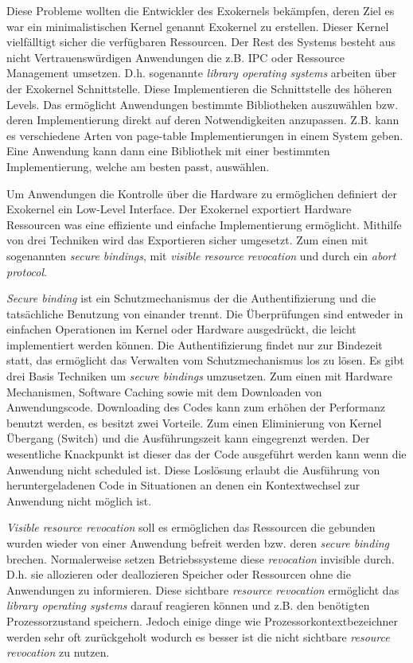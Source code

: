 \documentclass[11pt,technote]{IEEEtran}
\begin{document}
      Diese Probleme wollten die Entwickler des Exokernels bek\"ampfen, deren Ziel es war ein minimalistischen Kernel genannt Exokernel zu erstellen.
      Dieser Kernel vielf\"alltigt sicher die verf\"ugbaren Ressourcen. Der Rest des Systems besteht aus nicht Vertrauensw\"urdigen Anwendungen die
      z.B. IPC oder Ressource Management umsetzen. D.h. sogenannte \textit{library operating systems} arbeiten \"uber der Exokernel Schnittstelle. 
      Diese Implementieren die Schnittstelle des h\"oheren Levels. Das erm\"oglicht Anwendungen bestimmte Bibliotheken auszuw\"ahlen bzw.
      deren Implementierung direkt auf deren Notwendigkeiten anzupassen. Z.B. kann es verschiedene Arten von page-table Implementierungen
      in einem System geben. Eine Anwendung kann dann eine Bibliothek mit einer bestimmten Implementierung, welche am besten passt, ausw\"ahlen.
        
      Um Anwendungen die Kontrolle \"uber die Hardware zu erm\"oglichen definiert der Exokernel ein Low-Level Interface.
      Der Exokernel exportiert Hardware Ressourcen was eine effiziente und einfache Implementierung erm\"oglicht.
      Mithilfe von drei Techniken wird das Exportieren sicher umgesetzt. Zum einen mit sogenannten \textit{secure bindings}, 
      mit \textit{visible resource revocation} und durch ein \textit{abort protocol}. 
        
      \textit{Secure binding} ist ein Schutzmechanismus der die Authentifizierung und die tats\"achliche Benutzung von einander trennt.
      Die \"Uberpr\"ufungen sind entweder in einfachen Operationen im Kernel oder Hardware ausgedr\"uckt, die leicht implementiert werden k\"onnen.
      Die Authentifizierung findet nur zur Bindezeit statt, das erm\"oglicht das Verwalten vom Schutzmechanismus los zu l\"osen. Es gibt drei Basis Techniken
      um \textit{secure bindings} umzusetzen. Zum einen mit Hardware Mechanismen, Software Caching sowie mit dem Downloaden von Anwendungscode.
      Downloading des Codes kann zum erh\"ohen der Performanz benutzt werden, es besitzt zwei Vorteile. Zum einen Eliminierung von Kernel \"Ubergang (Switch)
      und die Ausf\"uhrungszeit kann eingegrenzt werden. Der wesentliche Knackpunkt ist dieser das der Code ausgef\"uhrt werden kann wenn die Anwendung nicht
      scheduled ist. Diese Losl\"osung erlaubt die Ausf\"uhrung von heruntergeladenen Code in Situationen an denen ein Kontextwechsel zur
      Anwendung nicht m\"oglich ist.
        
      \textit{Visible resource revocation} soll es erm\"oglichen das Ressourcen die gebunden wurden wieder von einer Anwendung befreit werden  
      bzw. deren \textit{secure binding} brechen. Normalerweise setzen Betriebssysteme diese \textit{revocation} invisible durch. 
      D.h. sie allozieren oder deallozieren Speicher oder Ressourcen ohne die Anwendungen zu informieren.
      Diese sichtbare \textit{resource revocation} erm\"oglicht das \textit{library operating systems} darauf reagieren k\"onnen und
      z.B. den ben\"otigten Prozessorzustand speichern. Jedoch einige dinge wie Prozessorkontextbezeichner werden sehr oft zur\"uckgeholt wodurch
      es besser ist die nicht sichtbare \textit{resource revocation} zu nutzen.
        
\end{document}
